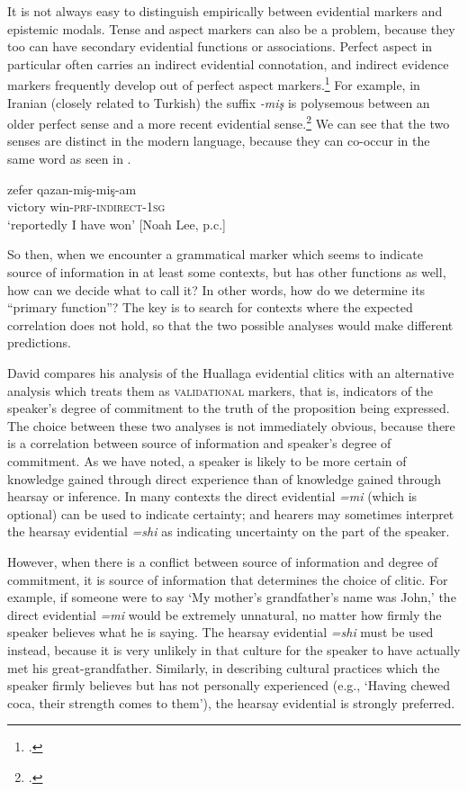 It is not always easy to distinguish empirically between evidential markers and epistemic modals. Tense and aspect markers can also be a problem, because they too can have secondary evidential functions or associations. Perfect aspect in particular often carries an indirect evidential connotation, and indirect evidence markers frequently develop out of perfect aspect markers.\footnote{\citet{Izvorski1997,BybeeEtAl1994}.} For example, in Iranian   (closely related to  {Turkish}) the suffix \textit{-miş} is polysemous between an older perfect sense and a more recent evidential sense.\footnote{\citet{Lee2008}.} We can see that the two senses are distinct in the modern language, because they can co-occur in the same word as seen in .


\ea \label{ex:17.5}
\gll zefer  qazan-miş-miş-am\\
victory  win-\textsc{prf}-\textsc{indirect-1sg}\\
\glt ‘reportedly I have won’  [Noah Lee, p.c.]
\z


So then, when we encounter a grammatical marker which seems to indicate source of information in at least some contexts, but has other functions as well, how can we decide what to call it? In other words, how do we determine its “primary function”? The key is to search for contexts where the expected correlation does not hold, so that the two possible analyses would make different predictions.



David \citet[421ff.]{Weber1989} compares his analysis of the Huallaga  evidential clitics with an alternative analysis which treats them as \textsc{validational} markers, that is, indicators of the speaker’s degree of commitment to the truth of the proposition being expressed. The choice between these two analyses is not immediately obvious, because there is a correlation between source of information and speaker’s degree of commitment. As we have noted, a speaker is likely to be more certain of knowledge gained through direct experience than of knowledge gained through hearsay or inference. In many contexts the direct evidential \textit{=mi} (which is optional) can be used to indicate certainty; and hearers may sometimes interpret the hearsay evidential \textit{=shi} as indicating uncertainty on the part of the speaker.



However, when there is a conflict between source of information and degree of commitment, it is source of information that determines the choice of clitic. For example, if someone were to say ‘My mother’s grandfather’s name was John,’ the direct evidential \textit{=mi} would be extremely unnatural, no matter how firmly the speaker believes what he is saying. The hearsay evidential \textit{=shi} must be used instead, because it is very unlikely in that culture for the speaker to have actually met his great-grandfather. Similarly, in describing cultural practices which the speaker firmly believes but has not personally experienced (e.g., ‘Having chewed coca, their strength comes to them’), the hearsay evidential is strongly preferred.



